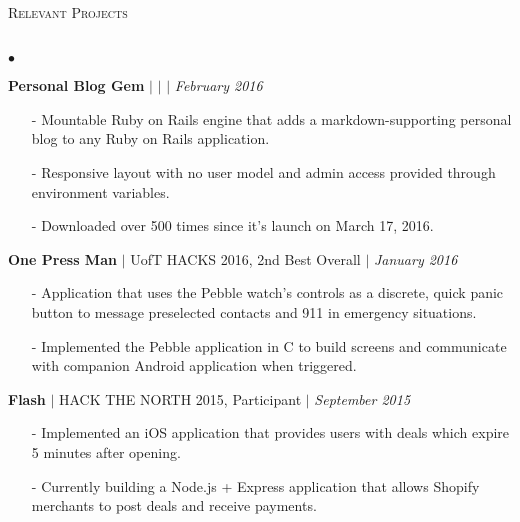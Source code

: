 \documentclass[10pt]{article}
\newcommand{\lineunder}{\vspace*{-8pt} \\ \hspace*{-18pt} \hrulefill \\}
\newcommand{\header}[1]{{\hspace*{-15pt}\vspace*{6pt} \textsc{#1}} \vspace*{-6pt} \lineunder }
\newenvironment{achievements}{\begin{list}{$\bullet$}{\topsep 0pt \itemsep -1.5pt \leftmargin 5pt}}{\vspace*{4pt}\end{list}}
\begin{document}
\header{\fontsize{11}{12}\selectfont Relevant Projects}
\begin{achievements}
\def\UrlFont{\em}
\item \textbf{Personal Blog Gem}  $|$  \href{https://github.com/nakulpathak3/personal-blog-gem}{\faGithub}   $|$  \href{http://nakulpathak.com/blog}{\faExternalLink}  $|$  \href{http://rubygems.org/gems/personal_blog}{\faDiamond} \hfill \textit {February 2016}
\begin{itemize}
\item[-]Mountable Ruby on Rails engine that adds a markdown-supporting personal blog to any Ruby on Rails application.
\vspace{2pt}
\item[-]Responsive layout with no user model and admin access provided through environment variables.
\vspace{2pt}
\item[-]Downloaded over 500 times since it's launch on March 17, 2016.
\end{itemize}
\vspace{2pt}
\item \textbf{One Press Man} {$|$ \scriptsize UofT HACKS 2016, 2nd Best Overall} $|$  \href{https://github.com/adrianmachado/Onepressman}{\faGithub} \hfill \textit {January 2016}
\begin{itemize}
\item[-]Application that uses the Pebble watch's controls as a discrete, quick panic button to message preselected contacts and 911 in emergency situations.
\vspace{2pt}
\item[-]Implemented the Pebble application in C to build screens and communicate with companion Android application when triggered.
\end{itemize}
\vspace{2pt}
\item \textbf{Flash} {$|$ \scriptsize HACK THE NORTH 2015, Participant} $|$  \href{https://github.com/nakulpathak3/Flash}{\faGithub} \hfill \textit {September 2015}
\begin{itemize}
\item[-]Implemented an iOS application that provides users with deals which expire 5 minutes after opening.
\vspace{2pt}
\item[-]Currently building a Node.js + Express application that allows Shopify merchants to post deals and receive payments.
\end{itemize}

\end{achievements}
\end{document}
